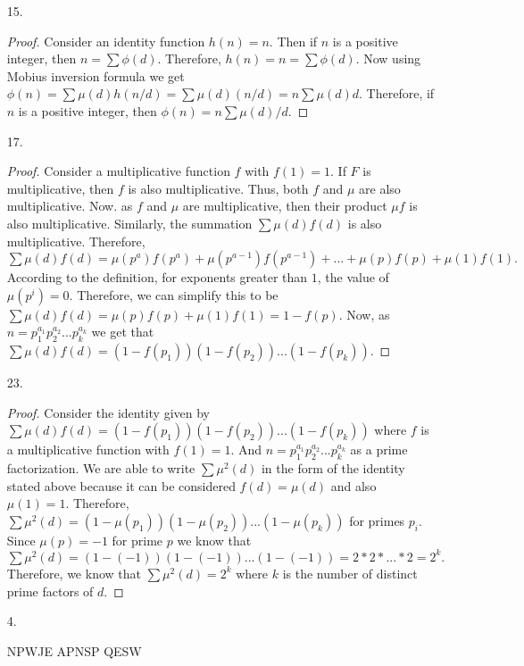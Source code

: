 \documentclass{article}
\theoremstyle{definition}
\begin{document}
\begin{enumerate}
    \item [15. ]
    
    \begin{proof}
    Consider an identity function $h(n) = n$. Then if $n$ is a positive integer, then $n = \sum\phi(d)$. Therefore, $h(n) = n = \sum\phi(d)$. Now using Mobius inversion formula we get $\phi(n) = \sum\mu(d)h(n/d) = \sum\mu(d)(n/d) = n\sum\mu(d)d.$ Therefore, if $n$ is a positive integer, then $\phi(n) = n\sum\mu(d)/d.$
    \end{proof}
    
    \item [17. ]
    
    \begin{proof}
    Consider a multiplicative function $f$ with $f(1) = 1$. If $F$ is multiplicative, then $f$ is also multiplicative. Thus, both $f$ and $\mu$ are also multiplicative. Now. as $f$ and $\mu$ are multiplicative, then their product $\mu f$ is also multiplicative. Similarly, the summation $\sum\mu(d)f(d)$ is also multiplicative. Therefore, $\sum\mu(d)f(d) = \mu(p^a)f(p^a) + \mu(p^{a-1})f(p^{a-1}) + ... + \mu(p)f(p) + \mu(1)f(1).$ According to the definition, for exponents greater than $1$, the value of $\mu(p^i) = 0$. Therefore, we can simplify this to be $\sum\mu(d)f(d) = \mu(p)f(p) + \mu(1)f(1) = 1 - f(p)$. Now, as $n = p_1^{a_1}p_2^{a_2}...p_k^{a_k}$ we get that $\sum\mu(d)f(d) = (1-f(p_1))(1-f(p_2))...(1-f(p_k)).$
    \end{proof}
    
    \item [23. ]
    
    
    \begin{proof}
    Consider the identity given by $\sum\mu(d)f(d) = (1-f(p_1))(1-f(p_2))...(1-f(p_k))$ where $f$ is a multiplicative function with $f(1) = 1$. And $n = p_1^{a_1}p_2^{a_2}...p_k^{a_k}$ as a prime factorization. We are able to write $\sum\mu^2(d)$ in the form of the identity stated above because it can be considered $f(d) = \mu(d)$ and also $\mu(1)=1.$ Therefore, $\sum\mu^2(d) = (1-\mu(p_1))(1-\mu(p_2))...(1-\mu(p_k))$ for primes $p_i.$ Since $\mu(p) = -1$ for prime $p$ we know that $\sum\mu^2(d) = (1-(-1))(1-(-1))...(1-(-1)) = 2*2*...*2 = 2^k.$ Therefore, we know that $\sum\mu^2(d) = 2^k$ where $k$ is the number of distinct prime factors of $d.$
    \end{proof}
    
    \item [4. ]
    
    NPWJE APNSP QESW
    

\end{enumerate}
\end{document}
